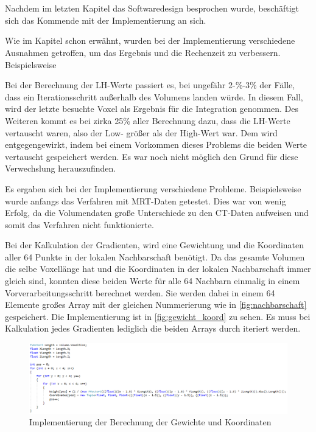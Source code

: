 \chapter{}
\label{sec:implementation}




Nachdem im letzten Kapitel das Softwaredesign besprochen wurde, beschäftigt sich das Kommende mit der Implementierung an sich.


Wie im Kapitel  schon erwähnt, wurden bei der Implementierung verschiedene Ausnahmen getroffen, um das Ergebnis und die Rechenzeit zu verbessern. Beispielsweise 


Bei der Berechnung der LH-Werte passiert es, bei ungefähr 2-\%-3\% der Fälle, dass ein Iterationsschritt außerhalb des Volumens landen würde. In diesem Fall, wird der letzte besuchte Voxel als Ergebnis für die Integration genommen. Des Weiteren kommt es bei zirka 25\% aller Berechnung dazu, dass die LH-Werte vertauscht waren, also der Low- größer als der High-Wert war. Dem wird entgegengewirkt, indem bei einem Vorkommen dieses Problems die beiden Werte vertauscht gespeichert werden. Es war noch nicht möglich den Grund für diese Verwechslung herauszufinden.

Es ergaben sich bei der Implementierung verschiedene Probleme. Beispielsweise wurde anfangs das Verfahren mit MRT-Daten getestet. Dies war von wenig Erfolg, da die Volumendaten große Unterschiede zu den CT-Daten aufweisen und somit das Verfahren nicht funktionierte.



Bei der Kalkulation der Gradienten, wird eine Gewichtung und die Koordinaten aller 64 Punkte in der lokalen Nachbarschaft benötigt. Da das gesamte Volumen die selbe Voxellänge hat und die Koordinaten in der lokalen Nachbarschaft immer gleich sind, konnten diese beiden Werte für alle 64 Nachbarn einmalig in einem Vorverarbeitungsschritt berechnet werden. Sie werden dabei in einem 64 Elemente großes Array mit der gleichen Nummerierung wie in \autoref{fig:nachbarschaft} gespeichert. Die Implementierung ist in \autoref{fig:gewicht_koord} zu sehen. Es muss bei Kalkulation jedes Gradienten lediglich die beiden Arrays durch iteriert  werden.


\begin{figure}[!h] 

\includegraphics[width=1.2\textwidth]{Logos/Nachbar_Code_Hell_Kurz.PNG}
\caption{Implementierung der Berechnung der Gewichte und Koordinaten} 
\label{fig:gewicht_koord} 
\end{figure}



